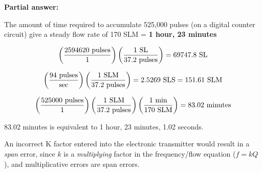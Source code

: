 
\noindent
{\bf Partial answer:}

\vskip 10pt

The amount of time required to accumulate 525,000 pulses (on a digital counter circuit) give a steady flow rate of 170 SLM = {\bf 1 hour, 23 minutes}







$$\left({2594620 \hbox{ pulses} \over 1} \right) \left( {1 \hbox{ SL} \over 37.2 \hbox{ pulses}} \right) = 69747.8 \hbox{ SL}$$

\vskip 10pt

$$\left( {94 \hbox{ pulses} \over \hbox{sec}} \right) \left( {1 \hbox{ SLM} \over 37.2 \hbox{ pulses}} \right) = 2.5269 \hbox{ SLS} = 151.61 \hbox{ SLM}$$

\vskip 10pt

$$\left( {525000 \hbox{ pulses} \over 1} \right) \left( {1 \hbox{ SLM} \over 37.2 \hbox{ pulses}} \right) \left( {1 \hbox{ min} \over 170 \hbox{ SLM}} \right) = 83.02 \hbox{ minutes}$$

83.02 minutes is equivalent to 1 hour, 23 minutes, 1.02 seconds.

\vskip 10pt

An incorrect K factor entered into the electronic transmitter would result in a {\it span} error, since $k$ is a {\it multiplying} factor in the frequency/flow equation ($f = kQ$), and multiplicative errors are span errors.





